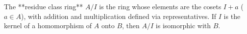 The **residue class ring** $A/I$ is the ring whose elements are the cosets $I + a$ ($a \in A$), with addition and multiplication defined via representatives. If $I$ is the kernel of a homomorphism of $A$ onto $B$, then $A/I$ is isomorphic with $B$.
